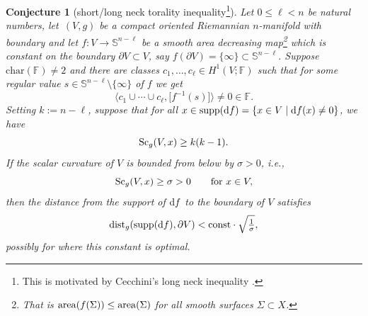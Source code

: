 \documentclass[10pt,a4paper]{amsart}
\numberwithin{equation}{section}
\newtheorem{Conjecture}[Theorem]{Conjecture}
 { \theoremstyle{definition}
\newtheorem{Definition}[Theorem]{Definition}
\newtheorem{Note}[Theorem]{Note}
\newtheorem{Example}[Theorem]{Example}
\newtheorem{Remark}[Theorem]{Remark}
}
\newcommand{\F}{\mathbb{F}}
\newcommand{\SSS}{\mathbb{S}}
\newcommand{\charac}{\mathrm{char}}
\newcommand{\Sc}{{\rm Sc}}
\begin{document}
\begin{Conjecture}[short/long neck torality inequality\footnote{This is motivated by Cecchini's long neck inequality \cite{Ce2020}.}]
\label{shortneck}
Let $0 \leq \ell < n$ be natural numbers, let~$(V,g)$ be a compact oriented Riemannian $n$-manifold with boundary and let
$f \colon  V\to \SSS^{n-\ell}$
be a smooth {\it area decreasing} map\footnote{That is ${\rm area}(f(\Sigma)) \leq {\rm area}(\Sigma)$ for all smooth surfaces $\Sigma\subset X$.} which is constant on the boundary $\partial V\subset V $, say $f(\partial V)=\{ \infty \}\subset \SSS^{n-\ell}$.
Suppose $\charac(\F) \neq 2$ and there are classes $c_1, \ldots, c_\ell \in H^1(V; \F)$ such that for some regular value $s \in \SSS^{n-\ell} \setminus \{ \infty\}$ of $f$ we get
\[
 \bigl\langle c_1 \cup \cdots \cup c_\ell, \bigl[ f^{-1}(s)\bigr] \bigr\rangle \neq 0 \in \F .
\]
Setting $k := n - \ell$, suppose that for all $x \in \operatorname{supp}( {\rm d}f) = \{ x \in V \mid {\rm d}f(x) \neq 0\}$, we have
\[
 \Sc_g(V, x) \geq k(k-1) .
\]
If the scalar curvature of $V$ is bounded from below by $\sigma > 0$, i.e.,
\[
 \Sc_g(V,x)\geq \sigma>0 \qquad \textrm{for } x\in V,
 \]
then the distance from the support of ${\rm d}f$ to the boundary of $V$ satisfies
\[
 {\rm dist}_g ( \operatorname{supp}({\rm d}f), \partial V) < {\rm const} \cdot \sqrt{\tfrac {1}{\sigma}},
 \]
 possibly for  where this constant is optimal.
 \end{Conjecture}
\end{document}
